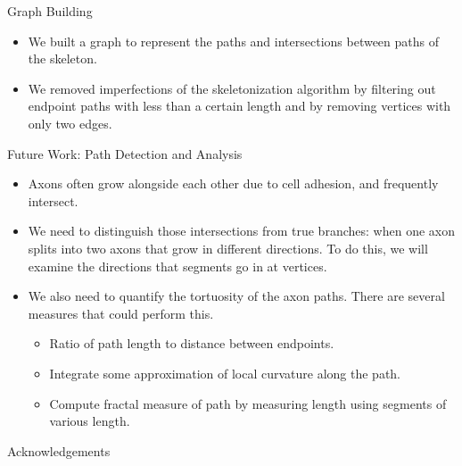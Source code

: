 \documentclass[final]{beamer}
\newlength{\colwidth}
\begin{document}
\begin{frame}[t]
\begin{columns}[t]
\begin{column}{\colwidth} %

\begin{block}{Graph Building}

\begin{itemize}
	\item We built a graph to represent the paths and intersections between paths of the skeleton.
	\item We removed imperfections of the skeletonization algorithm by filtering out endpoint paths with less than a certain length and by removing vertices with only two edges.
\end{itemize}

\end{block}

\begin{block}{Future Work: Path Detection and Analysis}

\begin{itemize}
	\item Axons often grow alongside each other due to cell adhesion, and frequently intersect.
	\item We need to distinguish those intersections from true branches: when one axon splits into two axons that grow in different directions. To do this, we will examine the directions that segments go in at vertices.
	\item We also need to quantify the tortuosity of the axon paths. There are several measures that could perform this.
		\begin{itemize}
			\item Ratio of path length to distance between endpoints.
			\item Integrate some approximation of local curvature along the path.
			\item Compute fractal measure of path by measuring length using segments of various length.
		\end{itemize}
\end{itemize}

\end{block}



\begin{block}{Acknowledgements}


\end{block}
\end{column}
\end{columns}
\end{frame}
\end{document}

